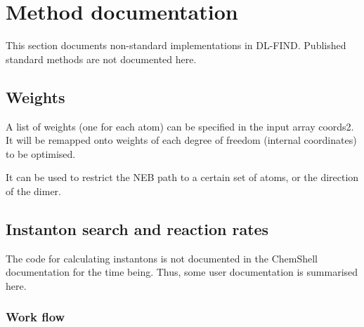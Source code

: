 \documentclass{article}
\begin{document}
\section{Method documentation}

This section documents non-standard implementations in DL-FIND. Published
standard methods are not documented here.

\subsection{Weights}

A list of weights (one for each atom) can be specified in the input array
coords2. It will be remapped onto weights of each degree of freedom (internal
coordinates) to be optimised.

It can be used to restrict the NEB path to a certain set of atoms, or the
direction of the dimer.

\newpage
\clearpage
\subsection{Instanton search and reaction rates}

The code for calculating instantons is not documented in the ChemShell
documentation for the time being. Thus, some user documentation is
summarised here.

\subsubsection{Work flow}
\end{document}
